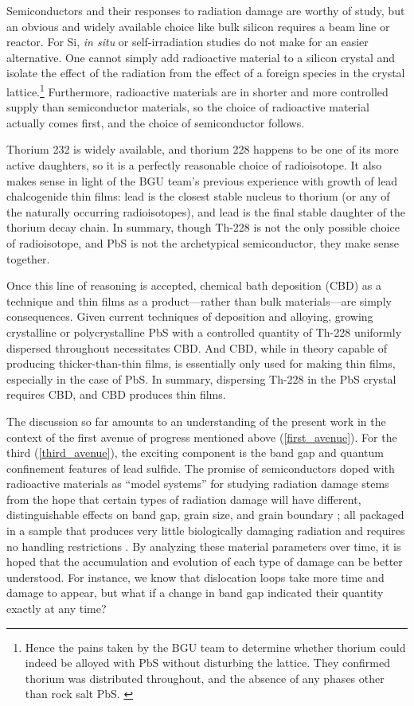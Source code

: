 Semiconductors and their responses to radiation damage are worthy of study, but an obvious and widely available choice like bulk silicon requires a beam line or reactor. For Si, \emph{in situ} or self-irradiation studies do not make for an easier alternative. One cannot simply add radioactive material to a silicon crystal and isolate the effect of the radiation from the effect of a foreign species in the crystal lattice.\footnote{Hence the pains taken by the BGU team to determine whether thorium could indeed be alloyed with PbS without disturbing the lattice. They confirmed thorium was distributed throughout, and the absence of any phases other than rock salt PbS. \cite{Templeman2017}} Furthermore, radioactive materials are in shorter and more controlled supply than semiconductor materials, so the choice of radioactive material actually comes first, and the choice of semiconductor follows.

Thorium 232 is widely available, and thorium 228 happens to be one of its more active daughters, so it is a perfectly reasonable choice of radioisotope. It also makes sense in light of the BGU team's previous experience with growth of lead chalcogenide thin films: lead is the closest stable nucleus to thorium (or any of the naturally occurring radioisotopes), and lead is the final stable daughter of the thorium decay chain. In summary, though Th-228 is not the only possible choice of radioisotope, and PbS is not the archetypical semiconductor, they make sense together.

Once this line of reasoning is accepted, chemical bath deposition (CBD) as a technique and thin films as a product---rather than bulk materials---are simply consequences. Given current techniques of deposition and alloying, growing crystalline or polycrystalline PbS with a controlled quantity of Th-228 uniformly dispersed throughout necessitates CBD. And CBD, while in theory capable of producing thicker-than-thin films, is essentially only used for making thin films, especially in the case of PbS. In summary, dispersing Th-228 in the PbS crystal requires CBD, and CBD produces thin films.

The discussion so far amounts to an understanding of the present work in the context of the first avenue of progress mentioned above (\ref{first_avenue}). For the third (\ref{third_avenue}), the exciting component is the band gap and quantum confinement features of lead sulfide. The promise of semiconductors doped with radioactive materials as ``model systems'' for studying radiation damage stems from the hope that certain types of radiation damage will have different, distinguishable effects on band gap, grain size, and grain boundary \cite{Templeman2017}; all packaged in a sample that produces very little biologically damaging radiation and requires no handling restrictions \cite{Templeman2017}. By analyzing these material parameters over time, it is hoped that the accumulation and evolution of each type of damage can be better understood. For instance, we know that dislocation loops take more time and damage to appear, but what if a change in band gap indicated their quantity exactly at any time?

